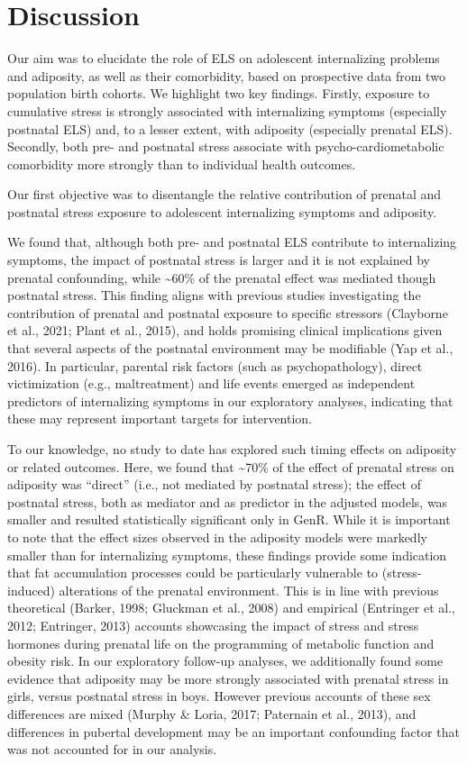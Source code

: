 \documentclass[
  letterpaper,
  DIV=11,
  numbers=noendperiod]{scrreport}
\begin{document}
\section{Discussion}\label{discussion}

Our aim was to elucidate the role of ELS on adolescent internalizing
problems and adiposity, as well as their comorbidity, based on
prospective data from two population birth cohorts. We highlight two key
findings. Firstly, exposure to cumulative stress is strongly associated
with internalizing symptoms (especially postnatal ELS) and, to a lesser
extent, with adiposity (especially prenatal ELS). Secondly, both pre-
and postnatal stress associate with psycho-cardiometabolic comorbidity
more strongly than to individual health outcomes.

Our first objective was to disentangle the relative contribution of
prenatal and postnatal stress exposure to adolescent internalizing
symptoms and adiposity.

We found that, although both pre- and postnatal ELS contribute to
internalizing symptoms, the impact of postnatal stress is larger and it
is not explained by prenatal confounding, while \textasciitilde60\% of
the prenatal effect was mediated though postnatal stress. This finding
aligns with previous studies investigating the contribution of prenatal
and postnatal exposure to specific stressors (Clayborne et al., 2021;
Plant et al., 2015), and holds promising clinical implications given
that several aspects of the postnatal environment may be modifiable (Yap
et al., 2016). In particular, parental risk factors (such as
psychopathology), direct victimization (e.g., maltreatment) and life
events emerged as independent predictors of internalizing symptoms in
our exploratory analyses, indicating that these may represent important
targets for intervention.

To our knowledge, no study to date has explored such timing effects on
adiposity or related outcomes. Here, we found that \textasciitilde70\%
of the effect of prenatal stress on adiposity was ``direct'' (i.e., not
mediated by postnatal stress); the effect of postnatal stress, both as
mediator and as predictor in the adjusted models, was smaller and
resulted statistically significant only in GenR. While it is important
to note that the effect sizes observed in the adiposity models were
markedly smaller than for internalizing symptoms, these findings provide
some indication that fat accumulation processes could be particularly
vulnerable to (stress-induced) alterations of the prenatal environment.
This is in line with previous theoretical (Barker, 1998; Gluckman et
al., 2008) and empirical (Entringer et al., 2012; Entringer, 2013)
accounts showcasing the impact of stress and stress hormones during
prenatal life on the programming of metabolic function and obesity risk.
In our exploratory follow-up analyses, we additionally found some
evidence that adiposity may be more strongly associated with prenatal
stress in girls, versus postnatal stress in boys. However previous
accounts of these sex differences are mixed (Murphy \& Loria, 2017;
Paternain et al., 2013), and differences in pubertal development may be
an important confounding factor that was not accounted for in our
analysis.
\end{document}
